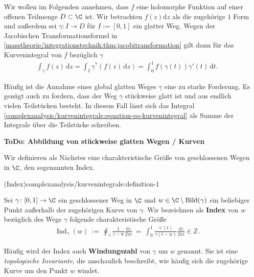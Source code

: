\documentclass[letterpaper,10pt,german]{jupyterBook}
\begin{document}
\par
Wir wollen im Folgenden annehmen, dass \(f\) eine holomorphe Funktion auf einer offenen Teilmenge \(D \subset \C\) ist.
Wir betrachten \(f(z) \mathrm{d}z\) als die zugehörige \(1\) Form und außerdem sei \(\gamma \colon I \rightarrow D\) für \(I := [0,1]\) ein glatter Weg.
Wegen der Jacobischen Transformationsformel in \cref{masstheorie/integrationstechnik:thm:jacobitransformation} gilt dann für das Kurvenintegral von \(f\) bezüglich \(\gamma\)
\begin{align}\label{equation:complexanalysis/kurvenintegrale:eq:kurvenintegral}
\int_{\gamma} f(z) \, \mathrm{d}z = \int_I \gamma^*(f(z) \, \mathrm{d}z) = \int_0^1 f(\gamma(t)) \gamma'(t) \, \mathrm{d}t.
\end{align}
\par
Häufig ist die Annahme eines global glatten Weges \(\gamma\) eine zu starke Forderung.
Es genügt auch zu fordern, dass der Weg \(\gamma\) stückweise glatt ist und aus endlich vielen Teilstücken besteht.
In diesem Fall lässt sich das Integral \cref{complexanalysis/kurvenintegrale:equation-eq-kurvenintegral} als Summe der Integrale über die Teilstücke schreiben.

\par
\textbf{ToDo: Abbildung von stückweise glatten Wegen / Kurven}

\par
Wir definieren als Nächstes eine charakteristische Größe von geschlossenen Wegen in \(\C\), den sogenannten Index.
\begin{definition}{(Index)}{complexanalysis/kurvenintegrale:definition-1}



\par
Sei \(\gamma \colon [0,1] \rightarrow \C\) ein geschlossener Weg in \(\C\) und \(w \in \C \setminus \operatorname{Bild}(\gamma)\) ein beliebiger Punkt außerhalb der zugehörigen Kurve von \(\gamma\).
Wir bezeichnen als \textbf{Index} von \(w\) bezüglich des Wegs \(\gamma\) folgende charakteristische Größe
\begin{align*}
\operatorname{Ind}_\gamma(w) \ := \ \oint_\gamma \frac{1}{z - w} \frac{\mathrm{d}z}{2\pi i} \ = \ \int_0^1 \frac{\gamma'(t)}{\gamma(t - w)} \frac{\mathrm{d}z}{2\pi i} \in \mathbb{Z}.
\end{align*}
\par
Häufig wird der Index auch \textbf{Windungszahl} von \(\gamma\) um \(w\) genannt.
Sie ist eine \emph{topologische Invariante}, die anschaulich beschreibt, wie häufig sich die zugehörige Kurve um den Punkt \(w\) windet.
\end{definition}
\end{document}
